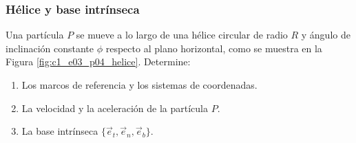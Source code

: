 \subsubsection{Hélice y base intrínseca}
Una partícula $P$ se mueve a lo largo de una hélice circular de radio $R$ y ángulo de inclinación constante $\phi$ respecto al plano horizontal, como se muestra en la Figura \ref{fig:c1_e03_p04_helice}. Determine:

\begin{enumerate}
    \item Los marcos de referencia y los sistemas de coordenadas.
    \item La velocidad y la aceleración de la partícula $P$.
    \item La base intrínseca $\{\vec{e}_t,\vec{e}_n,\vec{e}_b\}$.
\end{enumerate}

